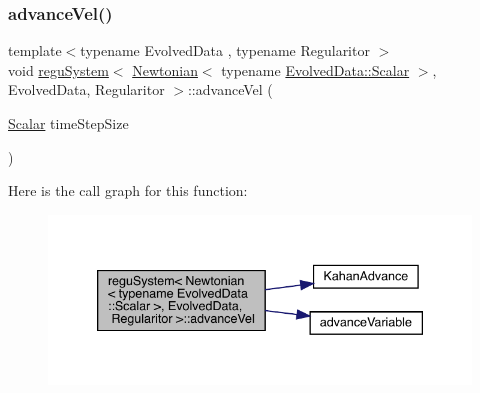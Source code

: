 \subsubsection{\texorpdfstring{advance\+Vel()}{advanceVel()}}
{\footnotesize\ttfamily template$<$typename Evolved\+Data , typename Regularitor $>$ \\
void \mbox{\hyperlink{classregu_system}{regu\+System}}$<$ \mbox{\hyperlink{class_newtonian}{Newtonian}}$<$ typename \mbox{\hyperlink{classregu_system_aca8ee2c387943164ee3ea68370fc3ac0}{Evolved\+Data\+::\+Scalar}} $>$, Evolved\+Data, Regularitor $>$\+::advance\+Vel (\begin{DoxyParamCaption}\item[{\mbox{\hyperlink{classregu_system_3_01_newtonian_3_01typename_01_evolved_data_1_1_scalar_01_4_00_01_evolved_data_00_01_regularitor_01_4_a6993f135075541f441a7642845b183a5}{Scalar}}}]{time\+Step\+Size }\end{DoxyParamCaption})}

Here is the call graph for this function\+:
\nopagebreak
\begin{figure}[H]
\begin{center}
\leavevmode
\includegraphics[width=339pt]{classregu_system_3_01_newtonian_3_01typename_01_evolved_data_1_1_scalar_01_4_00_01_evolved_data_00_01_regularitor_01_4_a04de03e59e9369cae79251b8ab876c2c_cgraph}
\end{center}
\end{figure}
\mbox{\label{classregu_system_3_01_newtonian_3_01typename_01_evolved_data_1_1_scalar_01_4_00_01_evolved_data_00_01_regularitor_01_4_a968643b9deaa2a579a025652238fdc75}} 

